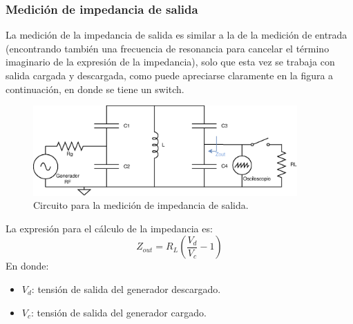 \documentclass{article}
\begin{document}
\subsubsection{Medición de impedancia de salida}
La medición de la impedancia de salida es similar a la de la medición de entrada (encontrando también una frecuencia de resonancia para cancelar el término imaginario de la expresión de la impedancia), solo que esta vez se trabaja con salida cargada y descargada, como puede apreciarse claramente en la figura a continuación, en donde se tiene un switch.
\begin{figure}[H]
\centering
\includegraphics[width=0.9\textwidth]{./img/figura26.eps}
\caption{Circuito para la medición de impedancia de salida.}
\label{fig:circuito26}
\end{figure}
\noindent La expresión para el cálculo de la impedancia es:
\begin{equation*}
    Z_{out} = R_L \left( \frac{V_d}{V_c} - 1 \right)
\end{equation*}
\noindent En donde:
\begin{itemize}
    \item $V_d$: tensión de salida del generador descargado.
    \item $V_c$: tensión de salida del generador cargado.
\end{itemize}
\end{document}
